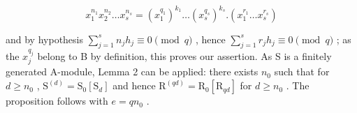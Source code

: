 \[
x _ {1} ^ {n _ {1}} x _ {2} ^ {n _ {2}} \dots x _ {s} ^ {n _ {s}} = (x _ {1} ^ {q _ {1}}) ^ {k _ {1}} \dots (x _ {s} ^ {q _ {s}}) ^ {k _ {s}}. (x _ {1} ^ {r _ {1}} \dots x _ {s} ^ {r _ {s}})
\]

and by hypothesis \(\sum_{j=1}^{s} n_j h_j \equiv 0 \pmod{q}\) , hence \(\sum_{j=1}^{s} r_j h_j \equiv 0 \pmod{q}\) ; as the \(x_j^{q_j}\) belong to B by definition, this proves our assertion. As S is a finitely generated A-module, Lemma 2 can be applied: there exists \(n_0\) such that for \(d \geqslant n_0\) , \(\mathrm{S}^{(d)} = \mathrm{S}_0[\mathrm{S}_d]\) and hence \(\mathrm{R}^{(qd)} = \mathrm{R}_0[\mathrm{R}_{qd}]\) for \(d \geqslant n_0\) . The proposition follows with \(e = q n_0\) .

